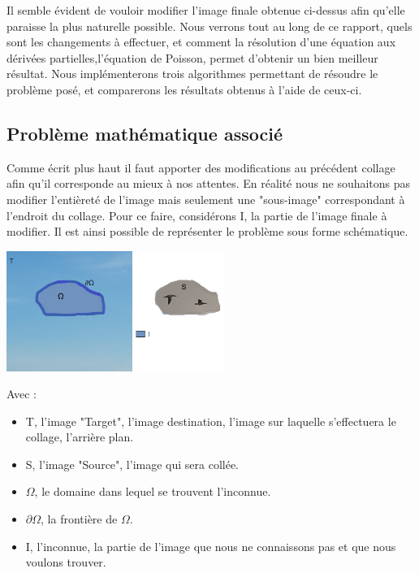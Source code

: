 Il semble évident de vouloir modifier l'image finale obtenue ci-dessus afin qu'elle paraisse la plus naturelle possible.
Nous verrons tout au long de ce rapport, quels sont les changements à effectuer, et comment la résolution d'une équation aux dérivées partielles,l'équation de Poisson, permet d'obtenir un bien meilleur résultat. Nous implémenterons trois algorithmes permettant de résoudre le problème posé, et comparerons les résultats obtenus à l'aide de ceux-ci.

\subsection{Problème mathématique associé}

Comme écrit plus haut il faut apporter des modifications au précédent collage afin qu'il corresponde au mieux à nos attentes. En réalité nous ne souhaitons pas modifier l'entièreté de l'image mais seulement une "sous-image" correspondant à l'endroit du collage. Pour ce faire, considérons I, la partie de l'image finale à modifier. Il est ainsi possible de représenter le problème sous forme schématique. 
\begin{center}
    \includegraphics[width = 200pt]{Images/Schee.jpg}
\end{center}

Avec : 
\begin{itemize}
    \item T,  l'image "Target", l'image destination, l'image sur laquelle s'effectuera le collage, l'arrière plan. 
    \item S, l'image "Source", l'image qui sera collée.
    \item $\Omega$, le domaine dans lequel se trouvent l'inconnue.
    \item $\partial \Omega$, la frontière de $\Omega$.
    \item I, l'inconnue, la partie de l'image que nous ne connaissons pas et que nous voulons trouver.
\end{itemize}

